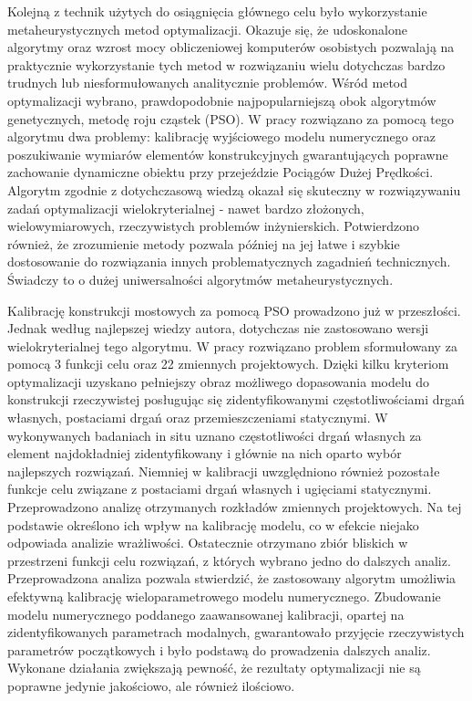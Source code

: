 Kolejną z technik użytych do osiągnięcia głównego celu było wykorzystanie metaheurystycznych metod optymalizacji. Okazuje się, że udoskonalone algorytmy oraz wzrost mocy obliczeniowej komputerów osobistych pozwalają na praktycznie wykorzystanie tych metod w rozwiązaniu wielu dotychczas bardzo trudnych lub niesformułowanych analitycznie problemów. Wśród metod optymalizacji wybrano, prawdopodobnie najpopularniejszą obok algorytmów genetycznych, metodę roju cząstek (PSO). W pracy rozwiązano za pomocą tego algorytmu dwa problemy: kalibrację wyjściowego modelu numerycznego oraz poszukiwanie wymiarów elementów konstrukcyjnych gwarantujących poprawne zachowanie dynamiczne obiektu przy przejeździe Pociągów Dużej Prędkości. Algorytm zgodnie z dotychczasową wiedzą okazał się skuteczny w rozwiązywaniu zadań optymalizacji wielokryterialnej - nawet bardzo złożonych, wielowymiarowych, rzeczywistych problemów inżynierskich. Potwierdzono również, że zrozumienie metody pozwala później na jej łatwe i szybkie dostosowanie do rozwiązania innych problematycznych zagadnień technicznych. Świadczy to o dużej uniwersalności algorytmów metaheurystycznych.

Kalibrację konstrukcji mostowych za pomocą PSO prowadzono już w przeszłości. Jednak według najlepszej wiedzy autora, dotychczas nie zastosowano wersji wielokryterialnej tego algorytmu. W pracy rozwiązano problem sformułowany za pomocą 3 funkcji celu oraz 22 zmiennych projektowych. Dzięki kilku kryteriom optymalizacji uzyskano pełniejszy obraz możliwego dopasowania modelu do konstrukcji rzeczywistej posługując się zidentyfikowanymi częstotliwościami drgań własnych, postaciami drgań oraz przemieszczeniami statycznymi. W wykonywanych badaniach in situ uznano częstotliwości drgań własnych za element najdokładniej zidentyfikowany i głównie na nich oparto wybór najlepszych rozwiązań. Niemniej w kalibracji uwzględniono również pozostałe funkcje celu związane z postaciami drgań własnych i ugięciami statycznymi. Przeprowadzono analizę otrzymanych rozkładów zmiennych projektowych. Na tej podstawie określono ich wpływ na kalibrację modelu, co w efekcie niejako odpowiada analizie wrażliwości. Ostatecznie otrzymano zbiór bliskich w przestrzeni funkcji celu rozwiązań, z których wybrano jedno do dalszych analiz. Przeprowadzona analiza pozwala stwierdzić, że zastosowany algorytm umożliwia efektywną kalibrację wieloparametrowego modelu numerycznego. Zbudowanie modelu numerycznego poddanego zaawansowanej kalibracji, opartej na zidentyfikowanych parametrach modalnych, gwarantowało przyjęcie rzeczywistych parametrów początkowych i było podstawą do prowadzenia dalszych analiz. Wykonane działania zwiększają pewność, że rezultaty optymalizacji nie są poprawne jedynie jakościowo, ale również ilościowo. 

